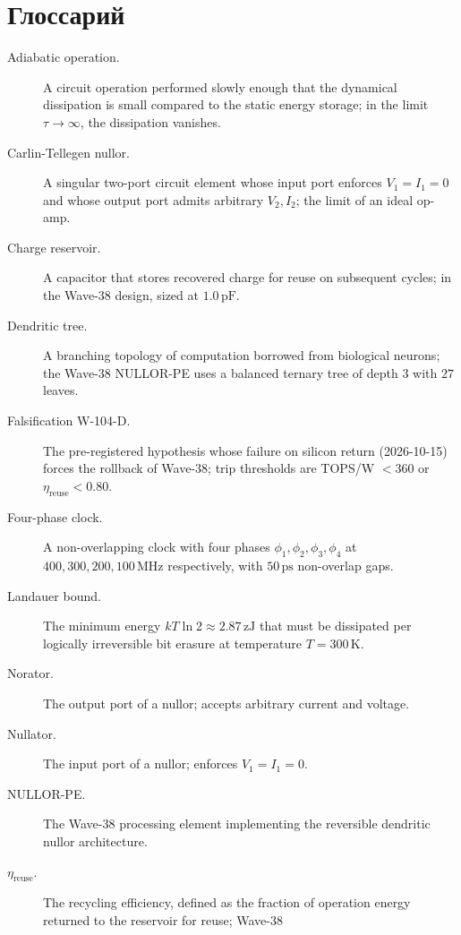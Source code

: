\section{Глоссарий}
\label{sec:glossary}

\begin{description}
  \item[Adiabatic operation.]  A circuit operation performed slowly enough that
    the dynamical dissipation is small compared to the static energy storage; in
    the limit $\tau \to \infty$, the dissipation vanishes.
  \item[Carlin-Tellegen nullor.]  A singular two-port circuit element whose input
    port enforces $V_1 = I_1 = 0$ and whose output port admits arbitrary $V_2, I_2$;
    the limit of an ideal op-amp.
  \item[Charge reservoir.]  A capacitor that stores recovered charge for reuse on
    subsequent cycles; in the Wave-38 design, sized at $1.0\,\text{pF}$.
  \item[Dendritic tree.]  A branching topology of computation borrowed from
    biological neurons; the Wave-38 NULLOR-PE uses a balanced ternary tree of
    depth $3$ with $27$ leaves.
  \item[Falsification W-104-D.]  The pre-registered hypothesis whose failure on
    silicon return (2026-10-15) forces the rollback of Wave-38; trip thresholds
    are TOPS/W $< 360$ or $\eta_{\text{reuse}} < 0.80$.
  \item[Four-phase clock.]  A non-overlapping clock with four phases $\phi_1,
    \phi_2, \phi_3, \phi_4$ at $400, 300, 200, 100\,\text{MHz}$ respectively,
    with $50\,\text{ps}$ non-overlap gaps.
  \item[Landauer bound.]  The minimum energy $kT \ln 2 \approx 2.87\,\text{zJ}$
    that must be dissipated per logically irreversible bit erasure at temperature
    $T = 300\,\text{K}$.
  \item[Norator.]  The output port of a nullor; accepts arbitrary current and
    voltage.
  \item[Nullator.]  The input port of a nullor; enforces $V_1 = I_1 = 0$.
  \item[NULLOR-PE.]  The Wave-38 processing element implementing the reversible
    dendritic nullor architecture.
  \item[$\eta_{\text{reuse}}$.]  The recycling efficiency, defined as the
    fraction of operation energy returned to the reservoir for reuse; Wave-38

\end{description}
